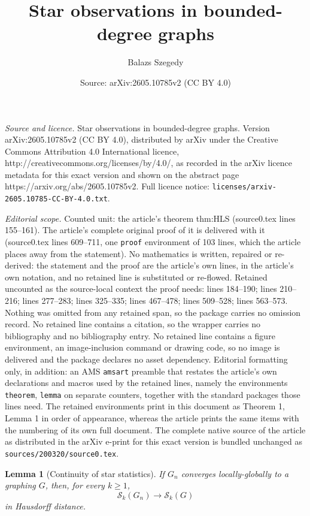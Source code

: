 \documentclass[10pt,a4paper]{amsart}
\title{Star observations in bounded-degree graphs}
\author{Balazs Szegedy}
\date{Source: arXiv:2605.10785v2 (CC BY 4.0)}
\newtheorem{lemma}{Lemma}
\newcommand{\calS}{\mathcal S}
\begin{document}
\maketitle

\noindent\emph{Source and licence.} Star observations in bounded-degree graphs. Version arXiv:2605.10785v2 (CC BY 4.0), distributed by arXiv under the Creative Commons Attribution 4.0 International licence, http://creativecommons.org/licenses/by/4.0/, as recorded in the arXiv licence metadata for this exact version and shown on the abstract page https://arxiv.org/abs/2605.10785v2. Full licence notice: \texttt{licenses/arxiv-2605.10785-CC-BY-4.0.txt}.\par\smallskip

\noindent\textit{Editorial scope.} Counted unit: the article's theorem thm:HLS (source0.tex lines 155--161). The article's complete original proof of it is delivered with it (source0.tex lines 609--711, one \texttt{proof} environment of 103 lines, which the article places away from the statement). No mathematics is written, repaired or re-derived: the statement and the proof are the article's own lines, in the article's own notation, and no retained line is substituted or re-flowed.  Retained uncounted as the source-local context the proof needs: lines 184--190; lines 210--216; lines 277--283; lines 325--335; lines 467--478; lines 509--528; lines 563--573.  Nothing was omitted from any retained span, so the package carries no omission record.  No retained line contains a citation, so the wrapper carries no bibliography and no bibliography entry.  No retained line contains a figure environment, an image-inclusion command or drawing code, so no image is delivered and the package declares no asset dependency.  Editorial formatting only, in addition: an AMS \texttt{amsart} preamble that restates the article's own declarations and macros used by the retained lines, namely the environments \texttt{theorem}, \texttt{lemma} on separate counters, together with the standard packages those lines need.  The retained environments print in this document as Theorem 1, Lemma 1 in order of appearance, whereas the article prints the same items with the numbering of its own full document.  The complete native source of the article as distributed in the arXiv e-print for this exact version is bundled unchanged as \texttt{sources/200320/source0.tex}.
\begin{lemma}[Continuity of star statistics]\label{lem:star-continuity}
If $G_n$ converges locally-globally to a graphing $G$, then, for every $k\geq 1$,
\[
 \calS_k(G_n)\longrightarrow \calS_k(G)
\]
in Hausdorff distance.
\end{lemma}
\end{document}
